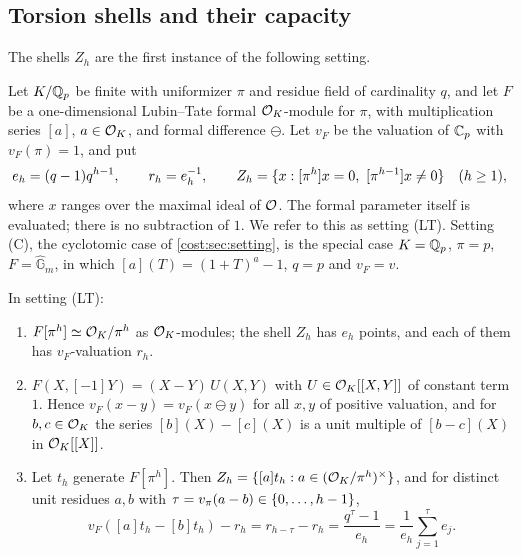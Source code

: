 \subsection{Torsion shells and their capacity}\label{cost:sec:shell}
{\raggedright{}}

The shells $Z_h$ are the first instance of the following setting.

\begin{definition}\label{cost:def:lt}
Let $K/\mathbb{Q}_p$ be finite with uniformizer $\pi$ and residue field of cardinality $q$, and let
$F$ be a one-dimensional Lubin--Tate formal $\mathcal{O}_K$-module for $\pi$, with multiplication
series $[a]$, $a\in\mathcal{O}_K$, and formal difference $\ominus$. Let $v_F$ be the valuation of
$\mathbb{C}_p$ with $v_F(\pi)=1$, and put
\[
 e_h=(q-1)q^{h-1},\qquad r_h=e_h^{-1},\qquad
 Z_h=\{x:[\pi^h]x=0,\ [\pi^{h-1}]x\ne0\}\quad(h\ge1),
\]
where $x$ ranges over the maximal ideal of $\mathcal{O}$. The formal parameter itself is evaluated;
there is no subtraction of $1$. We refer to this as setting \textup{(LT)}. Setting
\textup{(C)}, the cyclotomic case of \cref{cost:sec:setting}, is the special case $K=\mathbb{Q}_p$,
$\pi=p$, $F=\widehat{\mathbb G}_m$, in which $[a](T)=(1+T)^a-1$, $q=p$ and $v_F=v$.
\end{definition}

\begin{lemma}\label{cost:lem:metric}
In setting \textup{(LT)}:
\begin{enumerate}[label=\textup{(\roman*)}]
\item $F[\pi^h]\simeq\mathcal{O}_K/\pi^h$ as $\mathcal{O}_K$-modules; the shell $Z_h$ has $e_h$ points, and
each of them has $v_F$-valuation $r_h$.
\item $F(X,[-1]Y)=(X-Y)\,U(X,Y)$ with $U\in\mathcal{O}_K[[X,Y]]$ of constant term $1$. Hence
$v_F(x-y)=v_F(x\ominus y)$ for all $x,y$ of positive valuation, and for $b,c\in\mathcal{O}_K$ the
series $[b](X)-[c](X)$ is a unit multiple of $[b-c](X)$ in $\mathcal{O}_K[[X]]$.
\item Let $t_h$ generate $F[\pi^h]$. Then $Z_h=\{[a]t_h:a\in(\mathcal{O}_K/\pi^h)^\times\}$, and for
distinct unit residues $a,b$ with $\tau=v_\pi(a-b)\in\{0,\ldots,h-1\}$,
\begin{equation}\label{cost:eq:distance}
 v_F([a]t_h-[b]t_h)-r_h=r_{h-\tau}-r_h=\frac{q^\tau-1}{e_h}=\frac1{e_h}\sum_{j=1}^\tau e_j.
\end{equation}
\end{enumerate}
\end{lemma}

